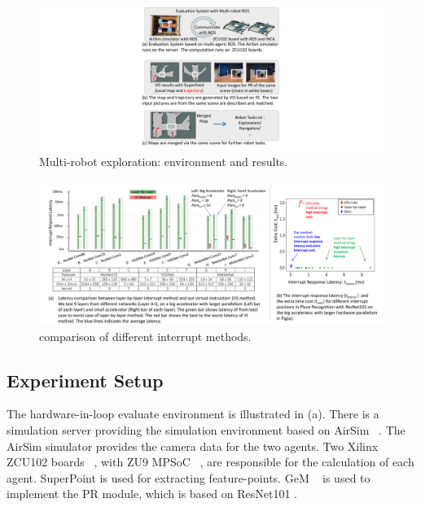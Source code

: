 \label{sec:experiments}


\begin{figure}[t]
  \centering
  \includegraphics[width=0.9\linewidth]{fig/env.pdf}
  \caption{Multi-robot exploration: environment and results. }
  \label{fig:env}
\end{figure}


\begin{figure}[t]
  \centering
  \includegraphics[width=0.99\linewidth]{fig/barresult.pdf}
  \caption{ comparison of different interrupt methods. }
  \label{fig:barresult}
\end{figure}




\subsection{ Experiment Setup }

The hardware-in-loop evaluate environment is illustrated in (a). There is a simulation server providing the simulation environment based on AirSim  ~\cite{shah2018airsim}. The AirSim simulator provides the camera data for the two agents. Two Xilinx ZCU102 boards  ~\cite{zcu102}, with ZU9 MPSoC  ~\cite{MPSoC}, are responsible for the calculation of each agent.
SuperPoint \cite{detone2018superpoint} is used for extracting feature-points. GeM  ~\cite{radenovic2018fine} is used to implement the PR module, which is based on ResNet101 \cite{he2016deep}. 

